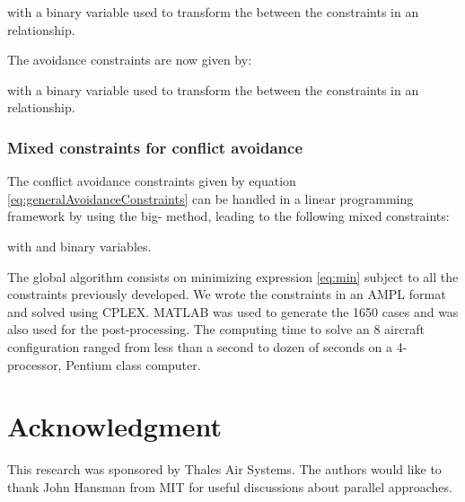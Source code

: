 \documentclass[a4paper, 10pt]{IEEEtran}
\begin{document}
with  a binary variable used to transform the  between the constraints in an  relationship.

The avoidance constraints are now given by:

with  a binary variable used to transform the  between the constraints in an  relationship.




\subsubsection{Mixed constraints for conflict avoidance}
The conflict avoidance constraints given by equation \ref{eq:generalAvoidanceConstraints} can be handled in a linear programming framework by using the big- method, leading to the following mixed constraints: 


with  and  binary variables. 

The global algorithm consists on minimizing expression \ref{eq:min} subject to all the constraints previously developed. We wrote the constraints in an AMPL format and solved using CPLEX. MATLAB was used to generate the 1650 cases and was also used for the post-processing. The computing time to solve an 8 aircraft configuration ranged from less than a second to dozen of seconds on a 4-processor, Pentium  class computer. 






\section*{Acknowledgment}
This research was sponsored by Thales Air Systems. The authors would like to thank John Hansman from MIT for useful discussions about parallel approaches. 







\end{document}
